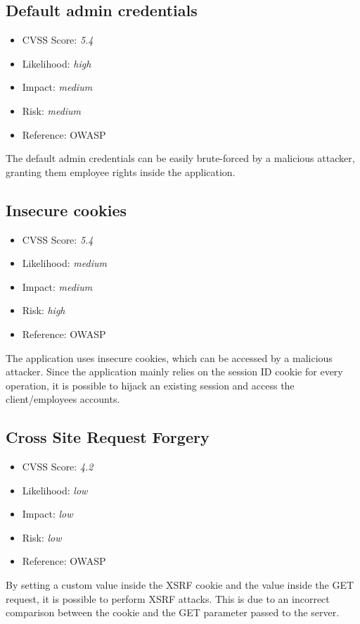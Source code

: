\subsection{Default admin credentials} \label{over:vuln_3}
\begin{itemize}
	\item CVSS Score: \textit{5.4}
	\item Likelihood: \textit{high}
	\item Impact: \textit{medium}
	\item Risk: \textit{medium}
	\item Reference: OWASP 
\end{itemize}
The default admin credentials can be easily brute-forced by a malicious attacker, granting them employee rights inside the \bs{} application.

\subsection{Insecure cookies} \label{over:vuln_4}
\begin{itemize}
	\item CVSS Score: \textit{5.4}
	\item Likelihood: \textit{medium}
	\item Impact: \textit{medium}
	\item Risk: \textit{high}
	\item Reference: OWASP 
\end{itemize}
The application uses insecure cookies, which can be accessed by a malicious attacker. Since the application mainly relies on the session ID cookie for every operation, it is possible to hijack an existing session and access the client/employees accounts.

\subsection{Cross Site Request Forgery} \label{over:vuln_5}
\begin{itemize}
	\item CVSS Score: \textit{4.2}
	\item Likelihood: \textit{low}
	\item Impact: \textit{low}
	\item Risk: \textit{low}
	\item Reference: OWASP 
\end{itemize}
By setting a custom value inside the XSRF cookie and the value inside the GET request, it is possible to perform XSRF attacks. This is due to an incorrect comparison between the cookie and the GET parameter passed to the server.

